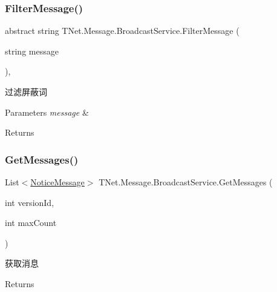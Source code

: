 \subsubsection{\texorpdfstring{Filter\+Message()}{FilterMessage()}}
{\footnotesize\ttfamily abstract string T\+Net.\+Message.\+Broadcast\+Service.\+Filter\+Message (\begin{DoxyParamCaption}\item[{string}]{message }\end{DoxyParamCaption})\hspace{0.3cm}{\ttfamily [protected]}, {}}



过滤屏蔽词 


\begin{DoxyParams}{Parameters}
{\em message} & \\
\hline
\end{DoxyParams}
\begin{DoxyReturn}{Returns}

\end{DoxyReturn}
\mbox{\label{class_t_net_1_1_message_1_1_broadcast_service_a0318c6f8ae57ed66119f88a385626126}} 
\subsubsection{\texorpdfstring{Get\+Messages()}{GetMessages()}}
{\footnotesize\ttfamily List$<$\mbox{\hyperlink{class_t_net_1_1_message_1_1_notice_message}{Notice\+Message}}$>$ T\+Net.\+Message.\+Broadcast\+Service.\+Get\+Messages (\begin{DoxyParamCaption}\item[{int}]{version\+Id,  }\item[{int}]{max\+Count }\end{DoxyParamCaption})}



获取消息 

\begin{DoxyReturn}{Returns}

\end{DoxyReturn}
\mbox{\label{class_t_net_1_1_message_1_1_broadcast_service_add615e0b3e5565dacee3460a14a7a0b2}} 
